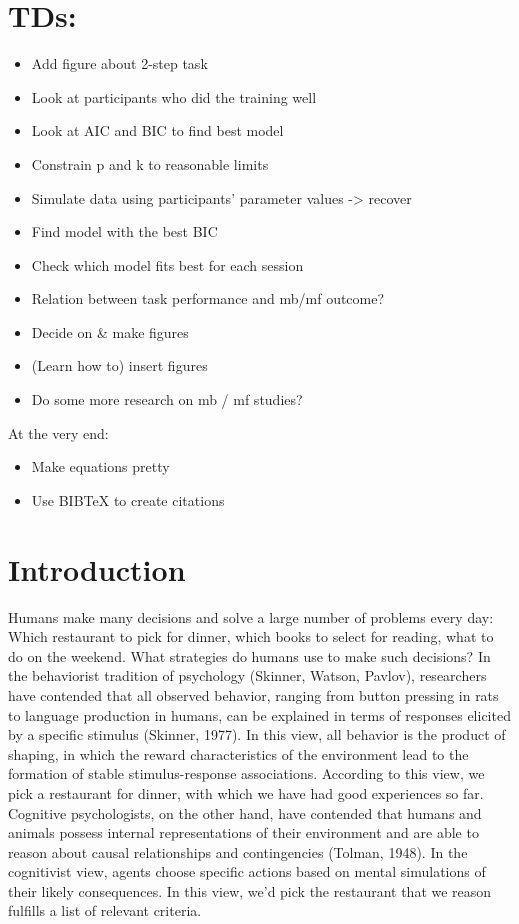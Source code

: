 \documentclass[11pt]{article} %
\begin{document}
\section{TDs:}
\begin{itemize}
	\item Add figure about 2-step task
	\item Look at participants who did the training well
	\item Look at AIC and BIC to find best model
	\item Constrain p and k to reasonable limits
	\item Simulate data using participants' parameter values -> recover
	\item Find model with the best BIC
	\item Check which model fits best for each session
	\item Relation between task performance and mb/mf outcome?
	\item Decide on \& make figures
	\item (Learn how to) insert figures
	\item Do some more research on mb / mf studies?
\end{itemize}

At the very end:
\begin{itemize}
	\item Make equations pretty
	\item Use BIBTeX to create citations
\end{itemize}

\section{Introduction}

Humans make many decisions and solve a large number of problems every day: Which restaurant to pick for dinner, which books to select for reading, what to do on the weekend. What strategies do humans use to make such decisions? In the behaviorist tradition of psychology (Skinner, Watson, Pavlov), researchers have contended that all observed behavior, ranging from button pressing in rats to language production in humans, can be explained in terms of responses elicited by a specific stimulus (Skinner, 1977). In this view, all behavior is the product of shaping, in which the reward characteristics of the environment lead to the formation of stable stimulus-response associations. According to this view, we pick a restaurant for dinner, with which we have had good experiences so far. Cognitive psychologists, on the other hand, have contended that humans and animals possess internal representations of their environment and are able to reason about causal relationships and contingencies (Tolman, 1948). In the cognitivist view, agents choose specific actions based on mental simulations of their likely consequences. In this view, we'd pick the restaurant that we reason fulfills a list of relevant criteria.
\end{document}
